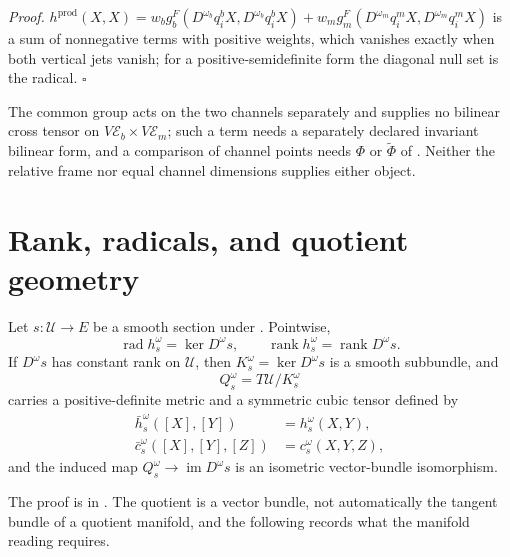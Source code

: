\noindent\emph{Proof.}
\(h^{\mathrm{prod}}(X,X)=w_bg_b^F(D^{\omega_b}q_i^bX,D^{\omega_b}q_i^bX)
+w_mg_m^F(D^{\omega_m}q_i^mX,D^{\omega_m}q_i^mX)\) is a sum of nonnegative terms with positive
weights, which vanishes exactly when both vertical jets vanish; for a positive-semidefinite form the
diagonal null set is the radical. \hfill$\square$

The common group acts on the two channels separately and supplies no bilinear cross tensor on
\(V\mathcal E_b\times V\mathcal E_m\); such a term needs a separately declared invariant bilinear
form, and a comparison of channel points needs \(\Phi\) or \(\widetilde\Phi\) of
. Neither the relative frame nor equal channel dimensions supplies
either object.

\section{Rank, radicals, and quotient geometry}
\label{sec:pb-rank-quotient}

Let \(s:\mathcal U\to E\) be a smooth section under . Pointwise,
\begin{equation}
\operatorname{rad}h_s^\omega
=\ker D^\omega s,
\qquad
\operatorname{rank}h_s^\omega
=\operatorname{rank}D^\omega s.
\label{eq:pb-pullback-radical-rank}
\end{equation}
If \(D^\omega s\) has constant rank on \(\mathcal U\), then \(K_s^\omega=\ker D^\omega s\) is a smooth
subbundle, and
\begin{equation}
Q_s^\omega=T\mathcal U/K_s^\omega
\label{eq:pb-pullback-quotient-bundle}
\end{equation}
carries a positive-definite metric and a symmetric cubic tensor defined by
\begin{align}
\bar h_s^\omega([X],[Y])
&=h_s^\omega(X,Y),
\label{eq:pb-pullback-quotient-metric}\\
\bar c_s^\omega([X],[Y],[Z])
&=c_s^\omega(X,Y,Z),
\label{eq:pb-pullback-quotient-amari}
\end{align}
and the induced map \(Q_s^\omega\to\operatorname{im}D^\omega s\) is an isometric vector-bundle
isomorphism. 

The proof is in . The quotient is a vector bundle, not automatically the tangent
bundle of a quotient manifold, and the following records what the manifold reading requires.

